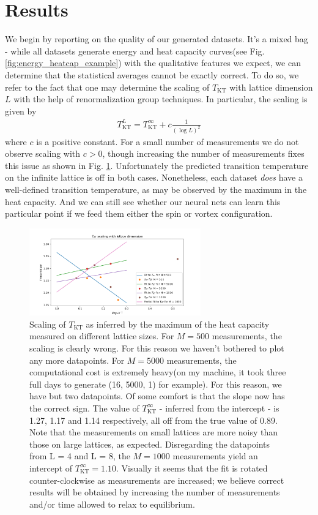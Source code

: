 \documentclass[]{article}
\begin{document}
\section{Results}
We begin by reporting on the quality of our generated datasets. It's a mixed bag - while all datasets generate energy and heat capacity curves(see Fig. \ref{fig:energy_heatcap_example}) with the qualitative features we expect, we can determine that the statistical averages cannot be exactly correct. To do so, we refer to the fact that one may determine the scaling of $T_\text{KT}$ with lattice dimension $L$ with the help of renormalization group techniques. In particular, the scaling is given by\cite{PhysRevLett.39.1201}
\begin{align}
T_\text{KT}^L = T_\text{KT}^\infty + c\frac{1}{(\log L)^2}
\end{align}
where $c$ is a positive constant. For a small number of measurements we do not observe scaling with $c > 0$, though increasing the number of measurements fixes this issue as shown in Fig. \ref{fig:tkt_scaling_L}. Unfortunately the predicted transition temperature on the infinite lattice is off in both cases. Nonetheless, each dataset \textit{does} have a well-defined transition temperature, as may be observed by the maximum in the heat capacity. And we can still see whether our neural nets can learn this particular point if we feed them either the spin or vortex configuration.

\begin{figure}[H]
	\vspace{-10px}
	\centering
	\includegraphics[width=280px]{../Plots/Tkt_scaling_with_lattice_2.png}
	\caption{Scaling of $T_\text{KT}$ as inferred by the maximum of the heat capacity measured on different lattice sizes. For $M = 500$ measurements, the scaling is clearly wrong. For this reason we haven't bothered to plot any more datapoints. For $M = 5000$ measurements, the computational cost is extremely heavy(on my machine, it took three full days to generate (16, 5000, 1) for example). For this reason, we have but two datapoints. Of some comfort is that the slope now has the correct sign. The value of $T_\text{KT}^\infty$ - inferred from the intercept - is 1.27, 1.17 and 1.14 respectively, all off from the true value of 0.89. Note that the measurements on small lattices are more noisy than those on large lattices, as expected. Disregarding the datapoints from L = 4 and L = 8, the $M = 1000$ measurements yield an intercept of $T_\text{KT}^\infty = 1.10$. Visually it seems that the fit is rotated counter-clockwise as measurements are increased; we believe correct results will be obtained by increasing the number of measurements and/or time allowed to relax to equilibrium. }
	\label{fig:tkt_scaling_L}
\end{figure}
\end{document}
